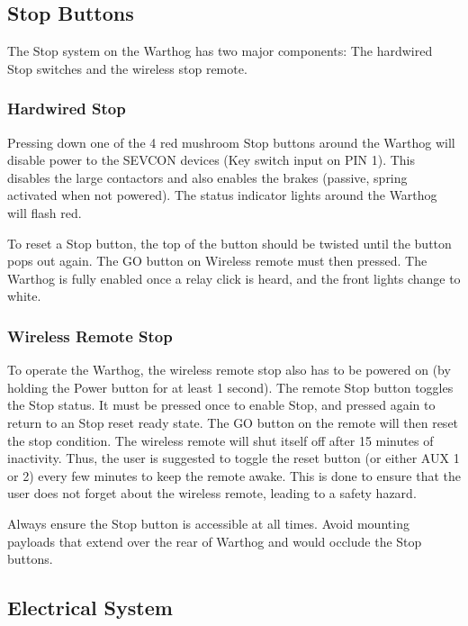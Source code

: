 \documentclass[]{clearpath-latex/clearpath-manual}
\begin{document}
\pagebreak[4]
\subsection{Stop Buttons}

The Stop system on the Warthog has two major components: The hardwired Stop switches and the wireless stop remote.

\subsubsection{Hardwired Stop}

Pressing down one of the 4 red mushroom Stop buttons around the Warthog will disable power to the SEVCON devices (Key switch input on PIN 1). This disables the large contactors and also enables the brakes (passive, spring activated when not powered). The status indicator lights around the Warthog will flash red.

To reset a Stop button, the top of the button should be twisted until the button pops out again. The GO button on Wireless remote must then pressed. The Warthog is fully enabled once a relay click is heard, and the front lights change to white.

\subsubsection{Wireless Remote Stop}

To operate the Warthog, the wireless remote stop also has to be powered on (by holding the Power button for at least 1 second). The remote Stop button toggles the Stop status. It must be pressed once to enable Stop, and pressed again to return to an Stop reset ready state. The GO button on the remote will then reset the stop condition. The wireless remote will shut itself off after 15 minutes of inactivity. Thus, the user is suggested to toggle the reset button (or either AUX 1 or 2) every few minutes to keep the remote awake. This is done to ensure that the user does not forget about the wireless remote, leading to a safety hazard.

Always ensure the Stop button is accessible at all times. Avoid mounting payloads that extend over the rear of Warthog and would occlude the Stop buttons.

\subsection{Electrical System}
\end{document}
